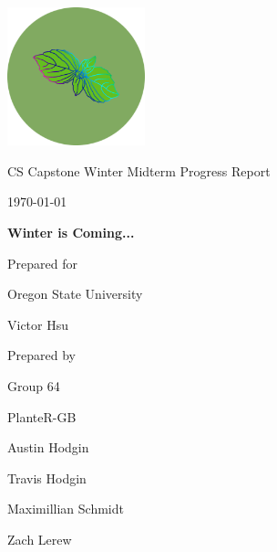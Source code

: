 \documentclass[onecolumn, draftclsnofoot,10pt, compsoc]{IEEEtran}
\def \CapstoneTeamName{			              			 PlanteR-GB}
\def \CapstoneTeamNumber{					           			 Group 64}
\def \GroupMemberOne{				           				Austin Hodgin}
\def \GroupMemberTwo{				           				Travis Hodgin}
\def \GroupMemberThree{			            Maximillian Schmidt}
\def\GroupMemberFour{		        	               Zach Lerew}
\def \CapstoneProjectName{	      	    Winter is Coming...}
\def \CapstoneSponsorCompany{		    Oregon State University}
\def \CapstoneSponsorPerson{		 			  				 Victor Hsu}
\def \DocType{		%
				Winter Midterm Progress Report
				}
\newcommand{\NameSigPair}[1]{\par
\makebox[2.75in][r]{#1} \hfil 	\makebox[3.25in]{\makebox[2.25in]{\hrulefill} \hfill		\makebox[.75in]{\hrulefill}}
\par\vspace{-12pt} \textit{\tiny\noindent
\makebox[2.75in]{} \hfil		\makebox[3.25in]{\makebox[2.25in][r]{Signature} \hfill	\makebox[.75in][r]{Date}}}}
\renewcommand{\NameSigPair}[1]{#1}
\begin{document}
\begin{titlepage}
    \begin{singlespace}
        \hfill

        \includegraphics[height=4cm]{logo.png}

        \par\vspace{.2in}
        \centering
        \scshape{
            \huge CS Capstone \DocType \par
            {\large\today}\par
            \vspace{.5in}
            \textbf{\Huge\CapstoneProjectName}\par

						\vspace{1in}

            {\large Prepared for}\par
            \Huge \CapstoneSponsorCompany\par
            \vspace{5pt}
            {\Large\NameSigPair{\CapstoneSponsorPerson}\par}

						\vspace{1in}

            {\large Prepared by}\par
						{\huge \CapstoneTeamNumber}\par
            \CapstoneTeamName\par
            \vspace{5pt}

            {
							\Large
							\NameSigPair{\GroupMemberOne}\par
							\NameSigPair{\GroupMemberTwo}\par
							\NameSigPair{\GroupMemberThree}\par
							\NameSigPair{\GroupMemberFour}\par
            }

}
\end{singlespace}
\end{titlepage}
\end{document}
